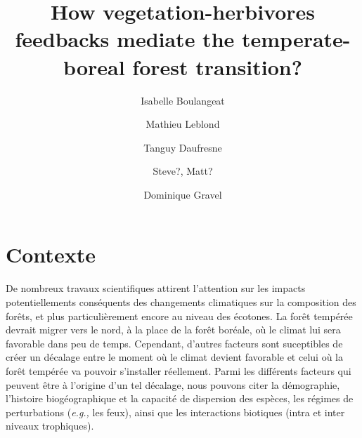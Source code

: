 
\usepackage[normalem]{ulem} %
\usepackage[textsize=footnotesize, backgroundcolor=white]{todonotes} %


%
%


\title{How vegetation-herbivores feedbacks mediate the temperate-boreal forest transition?}
\date{}
\author[1]{Isabelle Boulangeat}
\author[2]{Mathieu Leblond}
\author[3]{Tanguy Daufresne}
\author[1]{Steve?, Matt?}
\author[1]{Dominique Gravel}



%
%



%
%


\maketitle




\section{Contexte}

De nombreux travaux scientifiques attirent l'attention sur les impacts
potentiellements conséquents des changements climatiques sur la composition
des forêts, et plus particulièrement encore au niveau des écotones. La forêt
tempérée devrait migrer vers le nord, à la place de la forêt boréale, où le
climat lui sera favorable dans peu de temps. Cependant, d'autres facteurs sont
suceptibles de créer un décalage entre le moment où le climat devient
favorable et celui où la forêt tempérée va pouvoir s'installer réellement.
Parmi les différents facteurs qui peuvent être à l'origine d'un tel décalage,
nous pouvons citer la démographie, l'histoire biogéographique et la capacité
de dispersion des espèces, les régimes de perturbations (\textit{e.g.,} les
feux), ainsi que les interactions biotiques (intra et inter niveaux
trophiques).

